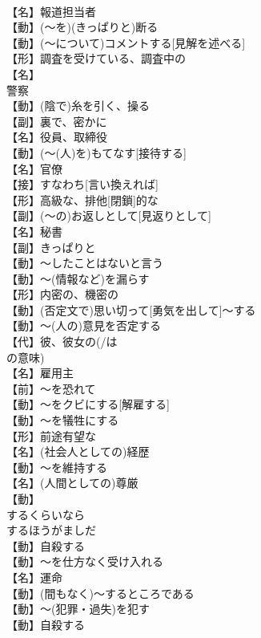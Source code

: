 \documentclass[8pt]{extreport}
\begin{document}
\begin{CJK}{UTF8}{min}
\\	【名】報道担当者
\\	【動】(～を)(きっぱりと)断る
\\	【動】(～について)コメントする[見解を述べる]
\\	【形】調査を受けている、調査中の
\\	【名】
\\	警察
\\	【動】(陰で)糸を引く、操る
\\	【副】裏で、密かに
\\	【名】役員、取締役
\\	【動】(～(人)を)もてなす[接待する]
\\	【名】官僚
\\	【接】すなわち[言い換えれば]
\\	【形】高級な、排他[閉鎖]的な
\\	【副】(～の)お返しとして[見返りとして]
\\	【名】秘書
\\	【副】きっぱりと
\\	【動】～したことはないと言う
\\	【動】～(情報など)を漏らす
\\	【形】内密の、機密の
\\	【動】(否定文で)思い切って[勇気を出して]～する
\\	【動】～(人の)意見を否定する
\\	【代】彼、彼女の(/は
\\	の意味)
\\	【名】雇用主
\\	【前】～を恐れて
\\	【動】～をクビにする[解雇する]
\\	【動】～を犠牲にする
\\	【形】前途有望な
\\	【名】(社会人としての)経歴
\\	【動】～を維持する
\\	【名】(人間としての)尊厳
\\	【動】
\\	するくらいなら
\\	するほうがましだ
\\	【動】自殺する
\\	【動】～を仕方なく受け入れる
\\	【名】運命
\\	【動】(間もなく)～するところである
\\	【動】～(犯罪・過失)を犯す
\\	【動】自殺する

\end{CJK}
\end{document}
